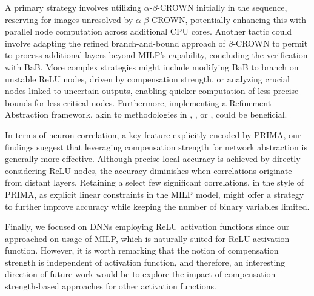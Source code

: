 A primary strategy involves utilizing $\alpha$-$\beta$-CROWN initially in the sequence, reserving {\toolname} for images unresolved by $\alpha$-$\beta$-CROWN, potentially enhancing this with parallel node computation across additional CPU cores. Another tactic could involve adapting the refined branch-and-bound approach of $\beta$-CROWN to permit {\toolname} to process additional layers beyond MILP's capability, concluding the verification with BaB. More complex strategies might include modifying BaB to branch on unstable ReLU nodes, driven by compensation strength, or analyzing crucial nodes linked to uncertain outputs, enabling quicker computation of less precise bounds for less critical nodes. Furthermore, implementing a Refinement Abstraction framework, akin to methodologies in \cite{atva}, \cite{elboher}, or \cite{SRGR}, could be beneficial.

In terms of neuron correlation, a key feature explicitly encoded by PRIMA, our findings suggest that leveraging compensation strength for network abstraction is generally more effective. Although precise local accuracy is achieved by directly considering ReLU nodes, the accuracy diminishes when correlations originate from distant layers. Retaining a select few significant correlations, in the style of PRIMA, as explicit linear constraints in the MILP model, might offer a strategy to further improve accuracy while keeping the number of binary variables limited. 

Finally, we focused on DNNs employing ReLU activation functions since our approached on usage of MILP, which is naturally suited for ReLU activation function. However, it is worth remarking that the notion of compensation strength is independent of activation function, and therefore, an interesting direction of future work would be to explore the impact of compensation strength-based approaches for other activation functions. 
\fi